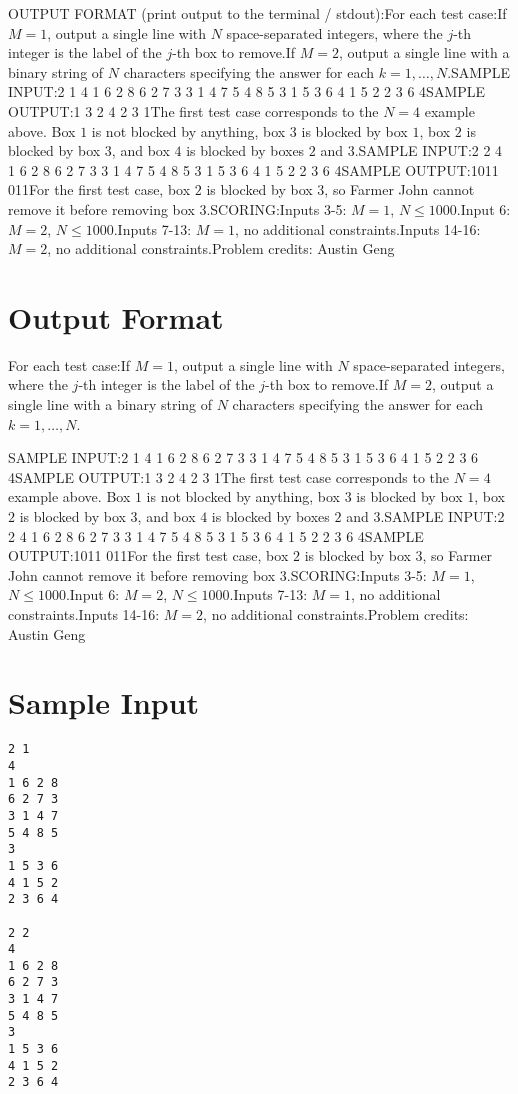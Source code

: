 \documentclass[12pt]{article}
\begin{document}
OUTPUT FORMAT (print output to the terminal / stdout):For each test case:If $M = 1$, output a single line with $N$ space-separated integers, where
the $j$-th integer is the label of the $j$-th box to remove.If
$M = 2$, output a single line with a binary string of $N$ characters specifying
the answer for each $k = 1, \dots, N$.SAMPLE INPUT:2 1
4
1 6 2 8
6 2 7 3
3 1 4 7
5 4 8 5
3
1 5 3 6
4 1 5 2
2 3 6 4SAMPLE OUTPUT:1 3 2 4
2 3 1The first test case corresponds to the $N = 4$ example above. Box $1$ is not
blocked by anything, box $3$ is blocked by box $1$, box $2$ is blocked by box
$3$, and box $4$ is blocked by boxes $2$ and $3$.SAMPLE INPUT:2 2
4
1 6 2 8
6 2 7 3
3 1 4 7
5 4 8 5
3
1 5 3 6
4 1 5 2
2 3 6 4SAMPLE OUTPUT:1011
011For the first test case, box $2$ is blocked by box $3$, so Farmer John cannot
remove it before removing box $3$.SCORING:Inputs 3-5: $M = 1$, $N\le 1000$.Input 6: $M = 2$,
$N \le 1000$.Inputs 7-13: $M = 1$, no additional constraints.Inputs 14-16: $M = 2$, no additional constraints.Problem credits: Austin Geng

\section*{Output Format}
For each test case:If $M = 1$, output a single line with $N$ space-separated integers, where
the $j$-th integer is the label of the $j$-th box to remove.If
$M = 2$, output a single line with a binary string of $N$ characters specifying
the answer for each $k = 1, \dots, N$.

SAMPLE INPUT:2 1
4
1 6 2 8
6 2 7 3
3 1 4 7
5 4 8 5
3
1 5 3 6
4 1 5 2
2 3 6 4SAMPLE OUTPUT:1 3 2 4
2 3 1The first test case corresponds to the $N = 4$ example above. Box $1$ is not
blocked by anything, box $3$ is blocked by box $1$, box $2$ is blocked by box
$3$, and box $4$ is blocked by boxes $2$ and $3$.SAMPLE INPUT:2 2
4
1 6 2 8
6 2 7 3
3 1 4 7
5 4 8 5
3
1 5 3 6
4 1 5 2
2 3 6 4SAMPLE OUTPUT:1011
011For the first test case, box $2$ is blocked by box $3$, so Farmer John cannot
remove it before removing box $3$.SCORING:Inputs 3-5: $M = 1$, $N\le 1000$.Input 6: $M = 2$,
$N \le 1000$.Inputs 7-13: $M = 1$, no additional constraints.Inputs 14-16: $M = 2$, no additional constraints.Problem credits: Austin Geng

\section*{Sample Input}
\begin{verbatim}
2 1
4
1 6 2 8
6 2 7 3
3 1 4 7
5 4 8 5
3
1 5 3 6
4 1 5 2
2 3 6 4

2 2
4
1 6 2 8
6 2 7 3
3 1 4 7
5 4 8 5
3
1 5 3 6
4 1 5 2
2 3 6 4
\end{verbatim}
\end{document}
